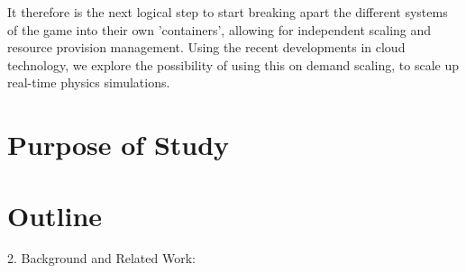 It therefore is the next logical step to start breaking apart the different systems of the game into their own 'containers', allowing for independent scaling and resource provision management.  
Using the recent developments in cloud technology, we explore the possibility of using this on demand scaling, to scale up real-time physics simulations.


\section{Purpose of Study}

\section{Outline}
2. Background and Related Work:
